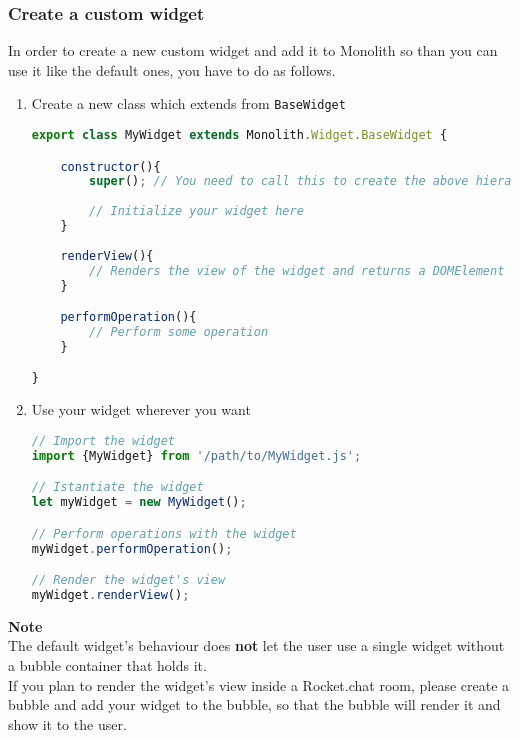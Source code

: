 \subsubsection{Create a custom widget}
In order to create a new custom widget and add it to Monolith so than you can use it like the default ones, you have to do as follows.
\begin{enumerate}

	\item Create a new class which extends from \texttt{BaseWidget}
\begin{lstlisting}[language=JavaScript]
export class MyWidget extends Monolith.Widget.BaseWidget {

    constructor(){
        super(); // You need to call this to create the above hierarchy
        
        // Initialize your widget here
    }
    
    renderView(){
        // Renders the view of the widget and returns a DOMElement object
    }

    performOperation(){
        // Perform some operation
    }

}
\end{lstlisting}

	\item Use your widget wherever you want
\begin{lstlisting}[language=JavaScript]
// Import the widget
import {MyWidget} from '/path/to/MyWidget.js';

// Istantiate the widget
let myWidget = new MyWidget();

// Perform operations with the widget
myWidget.performOperation();

// Render the widget's view
myWidget.renderView();
\end{lstlisting}
  
\end{enumerate}  
  
\textbf{Note} \\ 
The default widget's behaviour does \textbf{not} let the user use a single widget without a bubble container that holds it. \\
If you plan to render the widget's view inside a Rocket.chat room, please create a bubble and add your widget to the bubble, so that the bubble will render it and show it to the user.

\newpage

